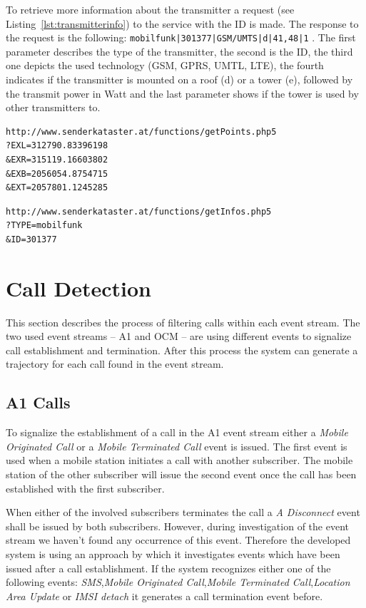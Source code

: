 To retrieve more information about the transmitter a request (see Listing~\ref{lst:transmitterinfo}) to the service with the ID is made. The response to the request is the following: \lstinline+mobilfunk|301377|GSM/UMTS|d|41,48|1+ . The first parameter describes the type of the transmitter, the second is the ID, the third one depicts the used technology (GSM, GPRS, UMTL, LTE), the fourth indicates if the transmitter is mounted on a roof (d) or a tower (e), followed by the transmit power in Watt and the last parameter shows if the tower is used by other transmitters to.
\begin{lstlisting}[caption=Request to retrieve station within the boudning box,label=lst:senderbbox]
http://www.senderkataster.at/functions/getPoints.php5
?EXL=312790.83396198
&EXR=315119.16603802
&EXB=2056054.8754715
&EXT=2057801.1245285
\end{lstlisting}

\begin{lstlisting}[caption=Request to retrieve transmitter information,label=lst:transmitterinfo]
http://www.senderkataster.at/functions/getInfos.php5
?TYPE=mobilfunk
&ID=301377
\end{lstlisting}



\section{Call Detection}
This section describes the process of filtering calls within each event stream. The two used event streams -- A1 and OCM -- are using different events to signalize call establishment and termination. After this process the system can generate a trajectory for each call found in the event stream.
\subsection{A1 Calls}
To signalize the establishment of a call in the A1 event stream either a \emph{Mobile Originated Call} or a \emph{Mobile Terminated Call} event is issued. The first event is used when a mobile station initiates a call with another subscriber. The mobile station of the other subscriber will issue the second event once the call has been established with the first subscriber.

When either of the involved subscribers terminates the call a \emph{A Disconnect} event shall be issued by both subscribers. However, during investigation of the event stream we haven't found any occurrence of this event. Therefore the developed system is using an approach by which it investigates events which have been issued after a call establishment. If the system recognizes either one of the following events: \emph{SMS},\emph{Mobile Originated Call},\emph{Mobile Terminated Call},\emph{Location Area Update} or \emph{IMSI detach} it generates a call termination event before. 


